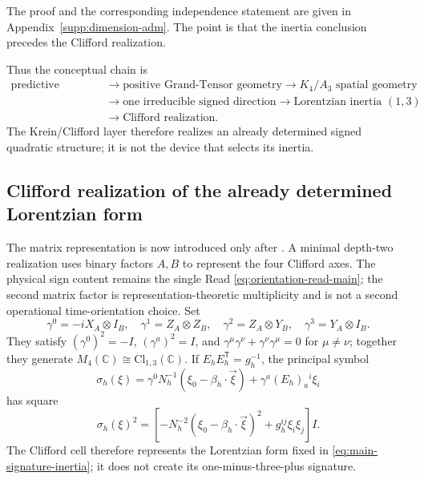 \documentclass[11pt]{article}
\theoremstyle{definition}
\theoremstyle{remark}
\newcommand{\C}{\mathbb C}
\newcommand{\Cl}{\mathrm{Cl}}
\begin{document}
The proof and the corresponding independence statement are given in
Appendix~\ref{supp:dimension-adm}.  The point is that the inertia conclusion
precedes the Clifford realization.

Thus the conceptual chain is
\begin{equation}
\boxed{
\begin{aligned}
\text{predictive collapse}
&\longrightarrow \text{positive Grand-Tensor geometry}
\longrightarrow K_4/A_3\text{ spatial geometry}\\
&\longrightarrow \text{one irreducible signed direction}
\longrightarrow \text{Lorentzian inertia }(1,3)\\
&\longrightarrow \text{Clifford realization}.
\end{aligned}}
\label{eq:predictive-krein-chain}
\end{equation}
The Krein/Clifford layer therefore realizes an already determined signed
quadratic structure; it is not the device that selects its inertia.

\subsection{Clifford realization of the already determined Lorentzian form}

The matrix representation is now introduced only after
.  A minimal depth-two realization uses
binary factors $A,B$ to represent the four Clifford axes.  The physical sign
content remains the single Read \eqref{eq:orientation-read-main}; the second
matrix factor is representation-theoretic multiplicity and is not a second
operational time-orientation choice.  Set
\begin{equation}
 \gamma^0=-iX_A\otimes I_B,
 \quad
 \gamma^1=Z_A\otimes Z_B,
 \quad
 \gamma^2=Z_A\otimes Y_B,
 \quad
 \gamma^3=Y_A\otimes I_B.
 \label{eq:clifford-main}
\end{equation}
They satisfy
$(\gamma^0)^2=-I$, $(\gamma^a)^2=I$, and
$\gamma^\mu\gamma^\nu+\gamma^\nu\gamma^\mu=0$ for $\mu\ne\nu$; together they
generate $M_4(\C)\cong\Cl_{1,3}(\C)$.  If $E_hE_h^{\mathsf T}=g_h^{-1}$, the
principal symbol
\begin{equation}
 \sigma_h(\xi)
 =\gamma^0N_h^{-1}(\xi_0-\beta_h\!\cdot\!\vec\xi)
  +\gamma^a(E_h)_a{}^i\xi_i
 \label{eq:dirac-symbol-main}
\end{equation}
has square
\begin{equation}
 \sigma_h(\xi)^2
 =\left[-N_h^{-2}(\xi_0-\beta_h\!\cdot\!\vec\xi)^2
        +g_h^{ij}\xi_i\xi_j\right]I.
 \label{eq:dirac-square-main}
\end{equation}
The Clifford cell therefore represents the Lorentzian form fixed in
\eqref{eq:main-signature-inertia}; it does not create its one-minus-three-plus
signature.
\end{document}
